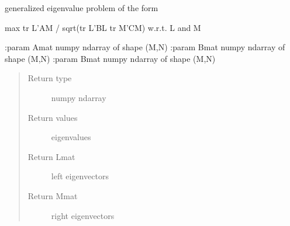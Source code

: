 \documentclass[letterpaper,10pt,english]{sphinxmanual}
\begin{document}

\begin{fulllineitems}
\label{\detokenize{utility_functions:utility_functions.geigen}}
generalized eigenvalue problem of the form

max tr L’AM / sqrt(tr L’BL tr M’CM) w.r.t. L and M

:param Amat numpy ndarray of shape (M,N)
:param Bmat numpy ndarray of shape (M,N)
:param Bmat numpy ndarray of shape (M,N)
\begin{quote}\begin{description}
\item[{Return type}] \leavevmode
numpy ndarray

\item[{Return values}] \leavevmode
eigenvalues

\item[{Return Lmat}] \leavevmode
left eigenvectors

\item[{Return Mmat}] \leavevmode
right eigenvectors

\end{description}\end{quote}

\end{fulllineitems}

\end{document}
